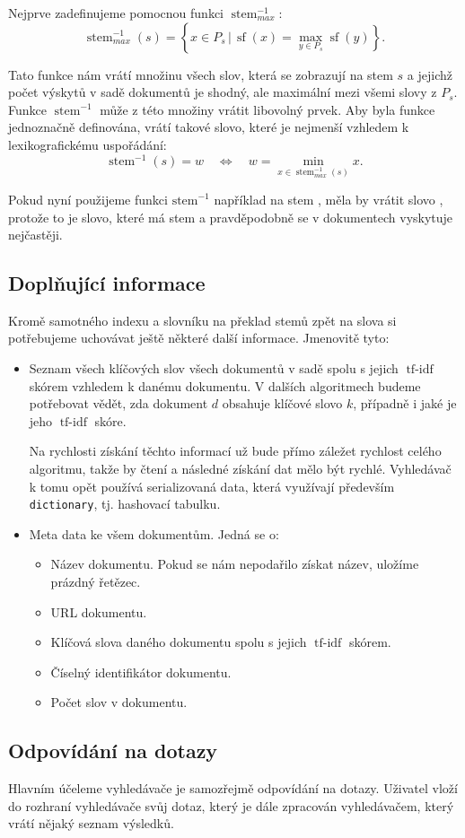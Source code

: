 \documentclass[12pt]{article}
\newcommand{\code}[1]{\texttt{#1}}
\newcommand{\sep}{\,|\,}
\newcommand{\ssection}[1]{\subsection{#1}}
\newcommand{\adds}[1]{\left\{#1\right\}}
\newcommand{\eq}{\Leftrightarrow}
\DeclareMathOperator{\tfidf}{tf-idf}
\DeclareMathOperator{\stem}{stem}
\DeclareMathOperator{\wcount}{sf}
\newcommand{\invstem}{\stem^{-1}}
\begin{document}
Nejprve zadefinujeme pomocnou funkci $\invstem_{max}$:
$$\invstem_{max}(s)=\adds{x\in P_s \sep \wcount(x) = \max_{y\in P_s}\wcount(y)}.$$

Tato funkce nám vrátí množinu všech slov, která se zobrazují na stem $s$ a jejichž počet výskytů v sadě dokumentů je shodný, ale maximální mezi všemi slovy z $P_s$. Funkce $\invstem$ může z této množiny vrátit libovolný prvek. Aby byla funkce jednoznačně definována, vrátí takové slovo, které je nejmenší vzhledem k lexikografickému uspořádání:
$$\invstem(s)=w\quad\eq\quad w=\min_{x\in \invstem_{max}(s)}x.$$

Pokud nyní použijeme funkci $\mbox{stem}^{-1}$ například na stem , měla by vrátit slovo , protože to je slovo, které má stem  a pravděpodobně se v dokumentech vyskytuje nejčastěji. 

\ssection{Doplňující informace}
Kromě samotného indexu a slovníku na překlad stemů zpět na slova si potřebujeme uchovávat ještě některé další informace. Jmenovitě tyto: 

\begin{itemize}
\item Seznam všech klíčových slov všech dokumentů v sadě spolu s jejich $\tfidf$ skórem vzhledem k danému dokumentu. V dalších algoritmech budeme potřebovat vědět, zda dokument $d$ obsahuje klíčové slovo $k$, případně i jaké je jeho $\tfidf$ skóre. 

Na rychlosti získání těchto informací už bude přímo záležet rychlost celého algoritmu, takže by čtení a následné získání dat mělo být rychlé. Vyhledávač k tomu opět používá serializovaná data, která využívají především \code{dictionary}, tj. hashovací tabulku. 

\item Meta data ke všem dokumentům. Jedná se o:
	\begin{itemize}
	\item Název dokumentu. Pokud se nám nepodařilo získat název, uložíme prázdný řetězec.
	\item URL dokumentu. 
	\item Klíčová slova daného dokumentu spolu s jejich $\tfidf$ skórem. 
	\item Číselný identifikátor dokumentu.
	\item Počet slov v dokumentu. 
	\end{itemize}
\end{itemize}




\ssection{Odpovídání na dotazy}
Hlavním účeleme vyhledávače je samozřejmě odpovídání na dotazy. Uživatel vloží do rozhraní vyhledávače svůj dotaz, který je dále zpracován vyhledávačem, který vrátí nějaký seznam výsledků. 
\end{document}
